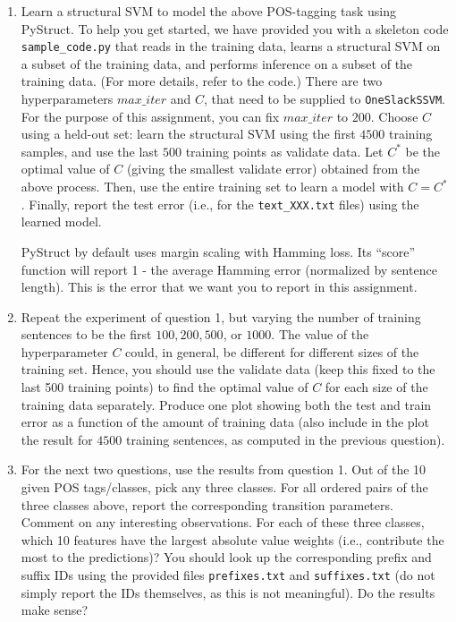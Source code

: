 \documentclass{article}
\begin{document}
\begin{enumerate}
\item Learn a structural SVM to model the above POS-tagging task using PyStruct. To help
you get started, we have provided you with a skeleton code \texttt{sample\_code.py} that reads
in the training data, learns a structural SVM on a subset of the training data, and performs inference on a subset of the training data. 
(For more details, refer to the code.) There
are two hyperparameters $max\_iter$ and $C$, that need to be supplied to
 \texttt{OneSlackSSVM}. For the purpose of this assignment, you can fix $max\_iter$ to $200$.
Choose $C$ using a held-out set: learn the structural SVM using the first $4500$ training samples,
and use the last $500$ training points as validate data. Let $C^*$ be the optimal
value of $C$ (giving the smallest validate error) obtained from the above process. Then, use the
entire training set to learn a model with $C=C^*$. Finally, report the test error (i.e., for the \texttt{text\_XXX.txt} files) using the learned model.

PyStruct by default uses margin scaling with Hamming loss. Its ``score'' function will report 1 - the average Hamming error (normalized by sentence length). This is the error that we want you to report in this assignment.

\item 
Repeat the experiment of question 1, but varying the number of training sentences to be the first $ 100, 200, 500$, or $1000$. The value of the hyperparameter $C$ could, in general, be different for different sizes of the training set. Hence, you should use the validate data (keep this fixed to the last 500 training points) to find the optimal value of $C$ for each size of the training data separately. Produce one plot showing both the test and train error as a function of the amount of training data (also include in the plot the result for $4500$ training sentences, as computed in the previous question).

\item For the next two questions, use the results from question 1. Out of the 10 given POS tags/classes, pick any three classes. For all ordered pairs of the three classes above, report the corresponding 
transition parameters. Comment on any interesting observations. 
For each of these three classes, which 10 features have the largest absolute value weights (i.e., contribute the most to the predictions)? You should look up the corresponding prefix and suffix IDs using the provided files \texttt{prefixes.txt} and \texttt{suffixes.txt} (do not simply report the IDs themselves, as this is not meaningful). Do the results make sense?


\end{enumerate}
\end{document}
